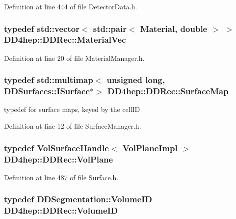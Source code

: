 Definition at line 444 of file DetectorData.h.\hypertarget{namespace_d_d4hep_1_1_d_d_rec_a69fdab2f851316d2b9e50956920359f7}{
\subsubsection[{MaterialVec}]{\setlength{\rightskip}{0pt plus 5cm}typedef std::vector$<$ std::pair$<$ {\bf Material}, double $>$ $>$ {\bf DD4hep::DDRec::MaterialVec}}}
\label{namespace_d_d4hep_1_1_d_d_rec_a69fdab2f851316d2b9e50956920359f7}


Definition at line 20 of file MaterialManager.h.\hypertarget{namespace_d_d4hep_1_1_d_d_rec_a04db40c967eb23286f472ac1c17931d1}{
\subsubsection[{SurfaceMap}]{\setlength{\rightskip}{0pt plus 5cm}typedef std::multimap$<$ unsigned long, {\bf DDSurfaces::ISurface}$\ast$$>$ {\bf DD4hep::DDRec::SurfaceMap}}}
\label{namespace_d_d4hep_1_1_d_d_rec_a04db40c967eb23286f472ac1c17931d1}


typedef for surface maps, keyed by the cellID 

Definition at line 12 of file SurfaceManager.h.\hypertarget{namespace_d_d4hep_1_1_d_d_rec_a6d192b28d640c45adbaa4d1ae9fb18b9}{
\subsubsection[{VolPlane}]{\setlength{\rightskip}{0pt plus 5cm}typedef {\bf VolSurfaceHandle}$<$ {\bf VolPlaneImpl} $>$ {\bf DD4hep::DDRec::VolPlane}}}
\label{namespace_d_d4hep_1_1_d_d_rec_a6d192b28d640c45adbaa4d1ae9fb18b9}


Definition at line 487 of file Surface.h.\hypertarget{namespace_d_d4hep_1_1_d_d_rec_a5b5fea15b3678944e1aba487a746bdcb}{
\subsubsection[{VolumeID}]{\setlength{\rightskip}{0pt plus 5cm}typedef {\bf DDSegmentation::VolumeID} {\bf DD4hep::DDRec::VolumeID}}}
\label{namespace_d_d4hep_1_1_d_d_rec_a5b5fea15b3678944e1aba487a746bdcb}


